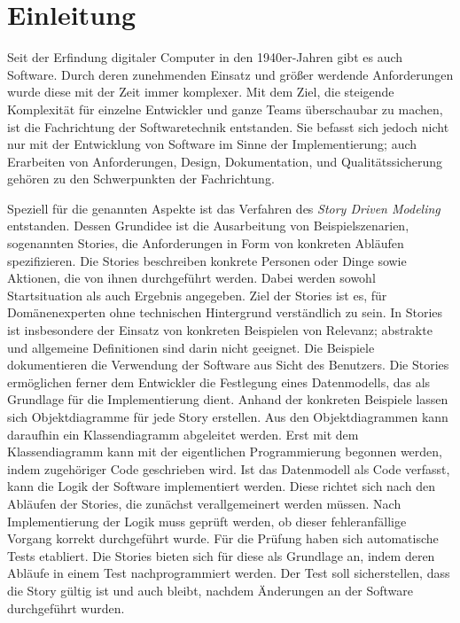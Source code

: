 \chapter{Einleitung}\label{ch:introduction}

Seit der Erfindung digitaler Computer in den 1940er-Jahren gibt es auch Software.
Durch deren zunehmenden Einsatz und größer werdende Anforderungen wurde diese mit der Zeit immer komplexer.
Mit dem Ziel, die steigende Komplexität für einzelne Entwickler und ganze Teams überschaubar zu machen, ist die Fachrichtung der Softwaretechnik entstanden.
Sie befasst sich jedoch nicht nur mit der Entwicklung von Software im Sinne der Implementierung;
auch Erarbeiten von Anforderungen, Design, Dokumentation, und Qualitätssicherung gehören zu den Schwerpunkten der Fachrichtung.

Speziell für die genannten Aspekte ist das Verfahren des \emph{Story Driven Modeling}~\cite{sdm} entstanden.
Dessen Grundidee ist die Ausarbeitung von Beispielszenarien, sogenannten Stories, die Anforderungen in Form von konkreten Abläufen spezifizieren.
Die Stories beschreiben konkrete Personen oder Dinge sowie Aktionen, die von ihnen durchgeführt werden.
Dabei werden sowohl Startsituation als auch Ergebnis angegeben.
Ziel der Stories ist es, für Domänenexperten ohne technischen Hintergrund verständlich zu sein.
In Stories ist insbesondere der Einsatz von konkreten Beispielen von Relevanz;
abstrakte und allgemeine Definitionen sind darin nicht geeignet.
Die Beispiele dokumentieren die Verwendung der Software aus Sicht des Benutzers.
Die Stories ermöglichen ferner dem Entwickler die Festlegung eines Datenmodells, das als Grundlage für die Implementierung dient.
Anhand der konkreten Beispiele lassen sich Objektdiagramme für jede Story erstellen.
Aus den Objektdiagrammen kann daraufhin ein Klassendiagramm abgeleitet werden.
Erst mit dem Klassendiagramm kann mit der eigentlichen Programmierung begonnen werden, indem zugehöriger Code geschrieben wird.
Ist das Datenmodell als Code verfasst, kann die Logik der Software implementiert werden.
Diese richtet sich nach den Abläufen der Stories, die zunächst verallgemeinert werden müssen.
Nach Implementierung der Logik muss geprüft werden, ob dieser fehleranfällige Vorgang korrekt durchgeführt wurde.
Für die Prüfung haben sich automatische Tests etabliert.
Die Stories bieten sich für diese als Grundlage an, indem deren Abläufe in einem Test nachprogrammiert werden.
Der Test soll sicherstellen, dass die Story gültig ist und auch bleibt, nachdem Änderungen an der Software durchgeführt wurden.


